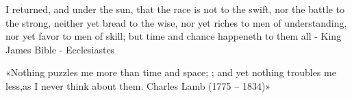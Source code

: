 I returned, and under the sun, that the race is not to the swift, nor the battle to the strong, neither yet bread to the wise, nor yet riches to men of understanding, nor yet favor to men of skill; but time and chance happeneth to them all - King James Bible - Ecclesiastes

«Nothing puzzles me more than time and space; ; and yet nothing troubles me less,as I never think about them.
Charles Lamb (1775 – 1834)»
